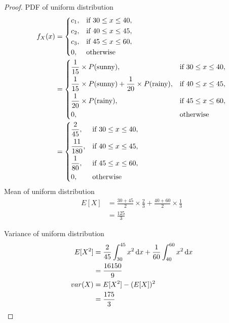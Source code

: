\documentclass[paper=usletter, fontsize=12pt]{article}
\begin{document}
\begin{enumerate}
\begin{enumerate}
\begin{proof}
                PDF of uniform distribution
                \begin{align*}
                    f_X(x) & =
                    \begin{dcases}
                        c_1,  & \text{if } 30 \le x \le 40,\\
                        c_2,  & \text{if } 40 \le x \le 45,\\
                        c_3,  & \text{if } 45 \le x \le 60,\\
                        0,    & \text{otherwise}
                    \end{dcases}\\
                    & = \begin{dcases}
                        \frac{1}{15} \times P(\text{sunny}), & \text{if } 30 \le x \le 40,\\
                        \frac{1}{15} \times P(\text{sunny}) + \frac{1}{20} \times P(\text{rainy}), & \text{if } 40 \le x \le 45,\\
                        \frac{1}{20} \times P(\text{rainy}), & \text{if } 45 \le x \le 60,\\
                        0,    & \text{otherwise}
                    \end{dcases}\\
                    & =\begin{dcases}
                        \frac{2}{45}, & \text{if } 30 \le x \le 40,\\
                        \frac{11}{180}, & \text{if } 40 \le x \le 45,\\
                        \frac{1}{80}, & \text{if } 45 \le x \le 60,\\
                        0,    & \text{otherwise}
                    \end{dcases}
                \end{align*}
                \endgroup
                Mean of uniform distribution
                \begin{align*}
                    E[X] & = \frac{30+45}{2} \times \frac{2}{3} + \frac{40+60}{2} \times \frac{1}{3}\\
                    & = \frac{125}{3}
                \end{align*}
                \endgroup

                Variance of uniform distribution
                \begin{align*}
                    E[X^2] & = \frac{2}{45}\int_{30}^{45}x^2\mathop{}\!\mathrm{d}{x} + \frac{1}{60}\int_{40}^{60}x^2\mathop{}\!\mathrm{d}{x}\\
                    & = \frac{16150}{9}\\
                    var(X) & = E[X^2] - (E[X])^2\\
                    & = \frac{175}{3}  \qedhere
                \end{align*}
                \endgroup


\end{proof}
\end{enumerate}
\end{enumerate}
\end{document}
